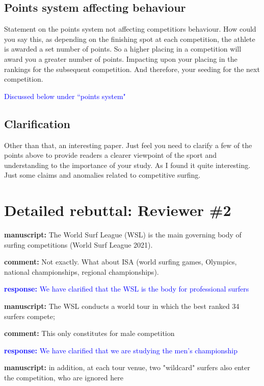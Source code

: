 \documentclass[12pt]{article}
\begin{document}
\subsection*{Points system affecting behaviour}


Statement on the points system not affecting competitiors
behaviour. How could you say this, as depending on the finishing spot
at each competition, the athlete is awarded a set number of points. So
a higher placing in a competition will award you a greater number of
points. Impacting upon your placing in the rankings for the subsequent
competition. And therefore, your seeding for the next competition.


\textcolor{blue}{Discussed below under ``points system"}

\subsection*{Clarification}


Other than that, an interesting paper. Just feel you need to clarify a
few of the points above to provide readers a clearer viewpoint of the
sport and understanding to the importance of your study. As I found it
quite interesting. Just some claims and anomalies related to
competitive surfing.
  

\section*{Detailed rebuttal: Reviewer \#2}


{\bf manuscript:} The World Surf League (WSL) is the main governing
  body of surfing competitions (World Surf League 2021).

{\bf comment:} Not exactly. What about ISA (world surfing games, Olympics, national
championships, regional championships).

\textcolor{blue}{{\bf response:} We have clarified that the WSL is the body for professional surfers}


\rule{0mm}{10mm}

{\bf manuscript:} The WSL conducts a
world tour in which the best ranked 34 surfers compete;

{\bf comment:} This only constitutes for male competition

\textcolor{blue}{{\bf response:} We have clarified that we are studying the men's
  championship}

\rule{0mm}{10mm}

{\bf manuscript: } in addition, at each tour venue, two "wildcard" surfers also enter the
competition, who are ignored here
\end{document}
